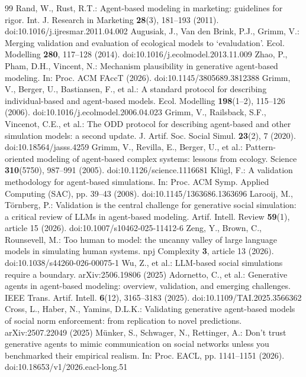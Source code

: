 \documentclass[runningheads]{llncs}
\begin{document}
\begin{thebibliography}{99}
Rand, W., Rust, R.T.: Agent-based modeling in marketing: guidelines for rigor. Int. J. Research in Marketing \textbf{28}(3), 181--193 (2011). doi:10.1016/j.ijresmar.2011.04.002
Augusiak, J., Van den Brink, P.J., Grimm, V.: Merging validation and evaluation of ecological models to `evaludation'. Ecol. Modelling \textbf{280}, 117--128 (2014). doi:10.1016/j.ecolmodel.2013.11.009
Zhao, P., Pham, D.H., Vincent, N.: Mechanism plausibility in generative agent-based modeling. In: Proc. ACM FAccT (2026). doi:10.1145/3805689.3812388
Grimm, V., Berger, U., Bastiansen, F., et al.: A standard protocol for describing individual-based and agent-based models. Ecol. Modelling \textbf{198}(1--2), 115--126 (2006). doi:10.1016/j.ecolmodel.2006.04.023
Grimm, V., Railsback, S.F., Vincenot, C.E., et al.: The ODD protocol for describing agent-based and other simulation models: a second update. J. Artif. Soc. Social Simul. \textbf{23}(2), 7 (2020). doi:10.18564/jasss.4259
Grimm, V., Revilla, E., Berger, U., et al.: Pattern-oriented modeling of agent-based complex systems: lessons from ecology. Science \textbf{310}(5750), 987--991 (2005). doi:10.1126/science.1116681
Kl\"ugl, F.: A validation methodology for agent-based simulations. In: Proc. ACM Symp. Applied Computing (SAC), pp. 39--43 (2008). doi:10.1145/1363686.1363696
Larooij, M., T{\"o}rnberg, P.: Validation is the central challenge for generative social simulation: a critical review of LLMs in agent-based modeling. Artif. Intell. Review \textbf{59}(1), article 15 (2026). doi:10.1007/s10462-025-11412-6
Zeng, Y., Brown, C., Rounsevell, M.: Too human to model: the uncanny valley of large language models in simulating human systems. npj Complexity \textbf{3}, article 13 (2026). doi:10.1038/s44260-026-00075-1
Wu, Z., et al.: LLM-based social simulations require a boundary. arXiv:2506.19806 (2025)
Adornetto, C., et al.: Generative agents in agent-based modeling: overview, validation, and emerging challenges. IEEE Trans. Artif. Intell. \textbf{6}(12), 3165--3183 (2025). doi:10.1109/TAI.2025.3566362
Cross, L., Haber, N., Yamins, D.L.K.: Validating generative agent-based models of social norm enforcement: from replication to novel predictions. arXiv:2507.22049 (2025)
M{\"u}nker, S., Schwager, N., Rettinger, A.: Don't trust generative agents to mimic communication on social networks unless you benchmarked their empirical realism. In: Proc. EACL, pp. 1141--1151 (2026). doi:10.18653/v1/2026.eacl-long.51

\end{thebibliography}
\end{document}
